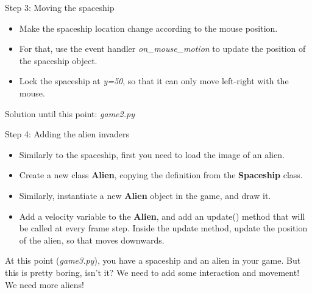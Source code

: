 \documentclass[10pt]{beamer}
\begin{document}
\begin{frame}{Step 3: Moving the spaceship}

\begin{itemize}
\item Make the spaceship location change according to the mouse position.
\item For that, use the event handler \textit{on\_mouse\_motion} to update the position of the spaceship object.

\item Lock the spaceship at \textit{y=50}, so that it can only move left-right with the mouse.

\end{itemize}

\vfill
\small{
Solution until this point: \textit{game2.py} }

\end{frame}


\begin{frame}{Step 4: Adding the alien invaders}

\begin{itemize}

\item Similarly to the spaceship, first you need to load the image of an alien.

\item Create a new class \textbf{Alien}, copying the definition from the \textbf{Spaceship} class. 

\item Similarly, instantiate a new \textbf{Alien} object in the game, and draw it. 

\item Add a velocity variable to the \textbf{Alien}, and add an update() method that will be called at every frame step. Inside the update method, update the position of the alien, so that moves downwards.

\end{itemize}

At this point (\textit{game3.py}), you have a spaceship and an alien in your game. But this is pretty boring, isn't it?
We need to add some interaction and movement! We need more aliens!

\end{frame}
\end{document}
